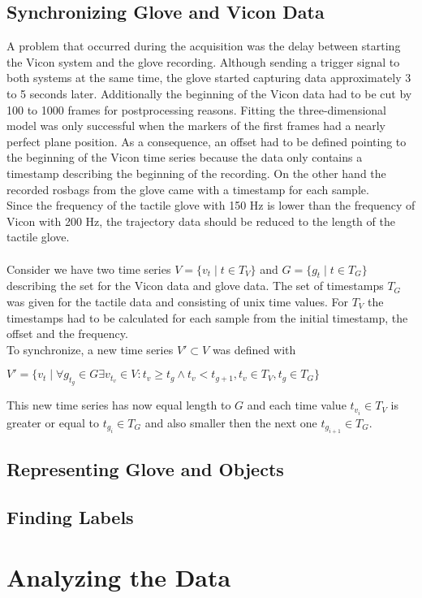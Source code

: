 \subsection{Synchronizing Glove and Vicon Data}
A problem that occurred during the acquisition was the delay between starting the Vicon system and the glove recording. Although sending a trigger signal to both systems at the same time, the glove started capturing data approximately 3 to 5 seconds later. Additionally the beginning of the Vicon data had to be cut by 100 to 1000 frames for postprocessing reasons. Fitting the three-dimensional model was only successful when the markers of the first frames had a nearly perfect plane position. As a consequence, an offset had to be defined pointing to the beginning of the Vicon time series because the data only contains a timestamp describing the beginning of the recording. On the other hand the recorded rosbags from the glove came with a timestamp for each sample.\\
Since the frequency of the tactile glove with 150 Hz is lower than the frequency of Vicon with 200 Hz, the trajectory data should be reduced to the length of the tactile glove.\\
\\
Consider we have two time series $V = \{v_{t} \mid t\in T_{V}\}$ and $G = \{g_{t} \mid t\in T_{G}\}$ describing the set for the Vicon data and glove data. The set of timestamps $T_{G}$ was given for the tactile data and consisting of unix time values. For $T_{V}$ the timestamps had to be calculated for each sample from the initial timestamp, the offset and the frequency. \\
To synchronize, a new time series $V' \subset V$ was defined with \begin{center}
$V' = \{v_{t} \mid \forall g_{t_{g}} \in G \exists v_{t_{v}} \in V : t_{v} \geq t_{g} \wedge t_{v} < t_{g+1}, t_{v} \in T_{V}, t_{g} \in T_{G} \}$
\end{center}
This new time series has now equal length to $G$ and each time value $t_{v_{i}} \in T_{V}$ is greater or equal to $t_{g_{i}} \in T_{G}$ and also smaller then the next one  $t_{g_{i+1}} \in T_{G}$.
\subsection{Representing Glove and Objects}
\subsection{Finding Labels}
\section{Analyzing the Data}